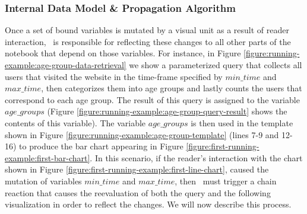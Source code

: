 \subsubsection*{Internal Data Model \&  Propagation Algorithm}
\label{section:change-propagation-datamodel}




Once a set of bound variables is mutated by a visual unit as a result of reader interaction, \projname\ is responsible for reflecting these changes to all other parts of the notebook that depend on those variables. For instance, in Figure \ref{figure:running-example:age-group-data-retrieval} we show a parameterized query that collects all users that visited the website in the time-frame specified by $min\_time$ and $max\_time$, then categorizes them into age groups and lastly counts the users that correspond to each age group. The result of this query is assigned to the variable $age\_groups$ (Figure \ref{figure:running-example:age-group-query-result} shows the contents of this variable). The variable $age\_groups$ is then used in the template shown in Figure \ref{figure:running-example:age-group-template} (lines 7-9 and 12-16) to produce the bar chart appearing in Figure \ref{figure:first-running-example:first-bar-chart}. In this scenario, if the reader's interaction with the chart shown in Figure \ref{figure:first-running-example:first-line-chart}, caused the mutation of variables $min\_time$ and $max\_time$, then \projname\ must trigger a chain reaction that causes the reevaluation of both the query and the following visualization in order to reflect the changes. We will now describe this process.



